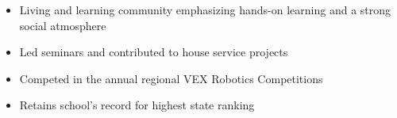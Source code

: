 \documentclass[10pt,a4paper,ragged2e,withhyper]{altacv}
\begin{document}
\begin{paracol}{2}


\medskip


\par\smallskip
{}

\par\smallskip
\divider

\par\smallskip
{}
\par\smallskip
{}

\par


\medskip 


\begin{itemize}
    \item Living and learning community emphasizing hands-on learning and a strong social atmosphere
    \item Led seminars and contributed to house service projects
\end{itemize}

\divider

\begin{itemize}
    \item Competed in the annual regional VEX Robotics Competitions
    \item Retains school's record for highest state ranking
\end{itemize}

\medskip

\end{paracol}
\end{document}

